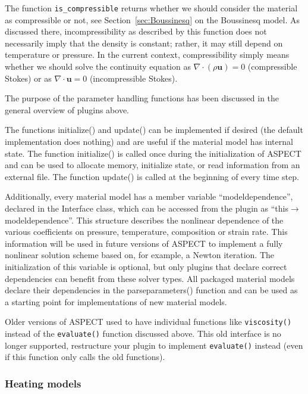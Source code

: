 \documentclass{article}
\newcommand{\aspect}{\textsc{ASPECT}}
\begin{document}
The function \texttt{is\_compressible} returns whether we should consider the
material as compressible or not, see Section~\ref{sec:Boussinesq} on the
Boussinesq model. As discussed there, incompressibility as described by this function
does not necessarily imply that the density is constant; rather, it
may still depend on temperature or pressure. In the current
context, compressibility simply means whether we should solve the continuity
equation as $\nabla \cdot (\rho \mathbf u)=0$ (compressible Stokes)
or as $\nabla \cdot \mathbf{u}=0$ (incompressible Stokes).

The purpose of the parameter handling functions has been discussed in the general
overview of plugins above.

The functions initialize() and update() can be implemented if desired (the default implementation does nothing) and are useful if the material model has internal state. The function
initialize() is called once during the initialization of \aspect{} and
can be used to allocate memory, initialize state, or read information from
an external file. The function update() is called at the beginning of
every time step.

Additionally, every material model has a member variable ``model\textunderscore dependence'',
declared in the Interface class, which can be accessed from the plugin as
``this$\rightarrow$model\textunderscore dependence''. This structure describes the
nonlinear dependence of the various coefficients on pressure, temperature, composition
or strain rate. This information will be used in future versions of \aspect{} to
implement a fully nonlinear solution scheme based on, for example, a Newton
iteration. The initialization of this variable is optional, but only plugins
that declare correct dependencies can benefit from these solver types. All
packaged material models declare their dependencies in the
parse\textunderscore parameters() function and can be used as a
starting point for implementations of new material models.

Older versions of \aspect{} used to have individual functions like
\texttt{viscosity()} instead of the \texttt{evaluate()} function discussed
above. This old interface is no longer supported, restructure your plugin to
implement \texttt{evaluate()} instead (even if this function only calls the old
functions).


\subsubsection{Heating models}
\label{sec:heating-models}
\end{document}
